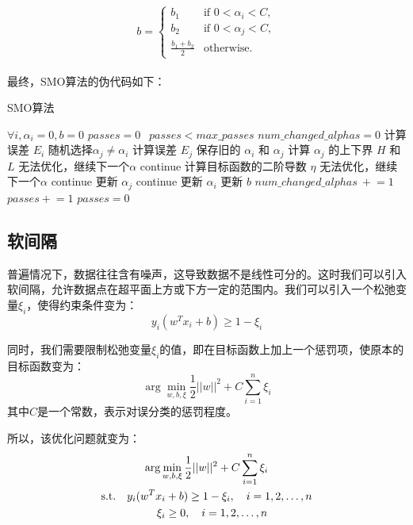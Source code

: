 \documentclass[a4paper]{article}
\begin{document}
\[
b = 
\begin{cases} 
b_1 & \text{if } 0 < \alpha_i < C, \\
b_2 & \text{if } 0 < \alpha_j < C, \\
\frac{b_1 + b_2}{2} & \text{otherwise}.
\end{cases}
\]
\ \\
最终，SMO算法的伪代码如下：
\begin{algorithm}
\caption{SMO算法}
\begin{algorithmic}[1]
\State $\forall i, \alpha_i=0, b=0$
\State $passes=0$
\While $\ \ passes < max\_passes$
    \State $num\_changed\_alphas = 0$
        \State 计算误差 $E_i$
            \State 随机选择$\alpha_j \neq \alpha_i$
            \State 计算误差 $E_j$
            \State 保存旧的 $\alpha_i$ 和 $\alpha_j$
            \State 计算 $\alpha_j$ 的上下界 $H$ 和 $L$
                \State 无法优化，继续下一个$\alpha$
                \State continue
            \EndIf
            \State 计算目标函数的二阶导数 $\eta$
                \State 无法优化，继续下一个$\alpha$
                \State continue
            \EndIf
            \State 更新 $\alpha_j$
                \State continue
            \EndIf
            \State 更新 $\alpha_i$
            \State 更新 $b$
            \State $num\_changed\_alphas\ +$$= 1$
        \EndIf
    \EndFor
        \State $passes +$$= 1$
    \Else
        \State $passes = 0$
    \EndIf
\EndWhile
\end{algorithmic}
\end{algorithm}

\newpage

\subsection{软间隔}
普遍情况下，数据往往含有噪声，这导致数据不是线性可分的。这时我们可以引入软间隔，允许数据点在超平面上方或下方一定的范围内。我们可以引入一个松弛变量$\xi_i$，使得约束条件变为：
\[y_i(w^T x_i+b) \geq 1 - \xi_i\]

同时，我们需要限制松弛变量$\xi_i$的值，即在目标函数上加上一个惩罚项，使原本的目标函数变为：
\[\arg\min_{w, b, \xi} \frac{1}{2}||w||^2 + C\sum_{i=1}^{n}\xi_i\]
其中$C$是一个常数，表示对误分类的惩罚程度。

所以，该优化问题就变为：
\begin{gather}
    \arg\min_{w, b, \xi} \frac{1}{2}||w||^2 + C\sum_{i=1}^{n}\xi_i \notag \\
    \text{s.t.} \quad y_i(w^T x_i+b) \geq 1 - \xi_i, \quad i=1,2,\ldots,n \notag \\
    \quad \xi_i \geq 0, \quad i=1,2,\ldots,n \notag
\end{gather}
\end{document}
